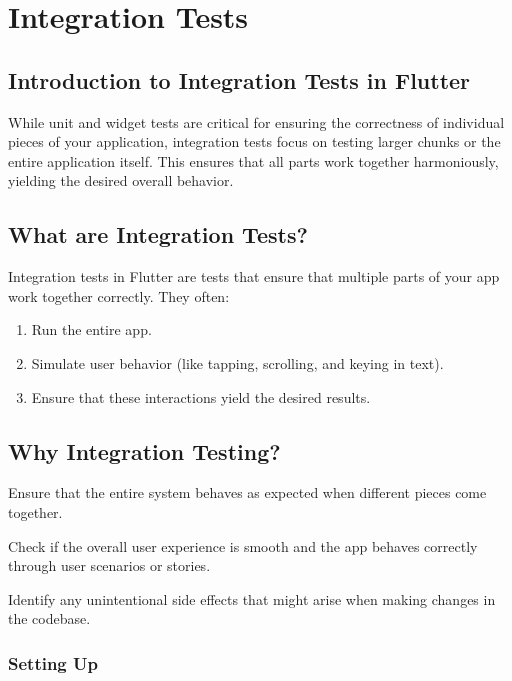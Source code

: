 \section{Integration Tests}

\subsection{Introduction to Integration Tests in Flutter}
While unit and widget tests are critical for ensuring the correctness of individual pieces of your application, integration tests focus on testing larger chunks or the entire application itself. 
This ensures that all parts work together harmoniously, yielding the desired overall behavior.

\subsection*{What are Integration Tests?}

Integration tests in Flutter are tests that ensure that multiple parts of your app work together correctly. 
They often:

\begin{enumerate}
 \item Run the entire app.
 \item Simulate user behavior (like tapping, scrolling, and keying in text).
 \item Ensure that these interactions yield the desired results.
\end{enumerate}

\subsection*{Why Integration Testing?}

Ensure that the entire system behaves as expected when different pieces come together.

Check if the overall user experience is smooth and the app behaves correctly through user scenarios or stories.

Identify any unintentional side effects that might arise when making changes in the codebase.

\subsubsection*{Setting Up}

